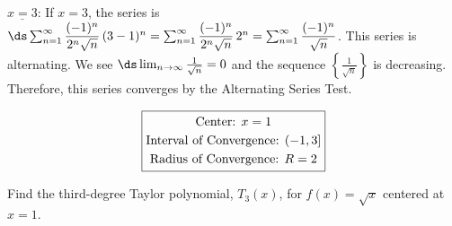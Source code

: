 \documentclass[12pt,letterpaper]{exam}
\begin{document}
\begin{questions}
{$\underline{x= 3}$: If $x= 3$, the series is $\ds\sum_{n=1}^\infty \dfrac{(-1)^n}{2^n \sqrt{n}} \,(3 - 1)^n= \sum_{n=1}^\infty \dfrac{(-1)^n}{2^n \sqrt{n}} \,2^n= \sum_{n=1}^\infty \dfrac{(-1)^n}{\sqrt{n}}$. This series is alternating. We see $\ds\lim_{n \to \infty} \frac{1}{\sqrt{n}}= 0$ and the sequence $\left\{ \tfrac{1}{\sqrt{n}} \right\}$ is decreasing. Therefore, this series converges by the Alternating Series Test. \par\vspace{0.3cm}
	\[
	\boxed{%
	\begin{gathered}
	\text{Center: } x= 1 \\
	\text{Interval of Convergence: } (-1, 3] \\
	\text{Radius of Convergence: } R= 2
	\end{gathered}}
	\]
}



\newpage
\question[10] Find the third-degree Taylor polynomial, $T_3(x)$, for $f(x)= \sqrt{x}$ centered at $x= 1$. \par\vspace{0.3cm}


\end{questions}
\end{document}
